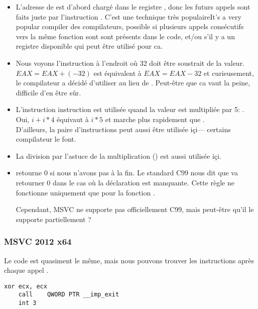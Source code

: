 \begin{itemize}
\item L'adresse de \printf est d'abord chargé dans le
registre \ESI, donc les futurs
appels \printf sont faits juste par l'instruction .
C'est une technique très populaireIt's a very popular compiler 
des compilateurs, possible si plusieurs appels consécutifs vers la même fonction sont sont présents
dans le code, et/ou s'il y a un registre disponible qui peut être utilisé pour ca.

\item Nous voyons l'instruction  
à l'endroit où 32 doit être soustrait de la valeur.
$EAX=EAX+(-32)$ est équivalent à $EAX=EAX-32$ 
et curieusement, le compilateur a décidé d'utiliser  au lieu de .
Peut-être que ca vaut la peine, difficile d'en être sûr.

\item L'instruction \LEA instruction est utilisée quand 
la valeur est multipliée par 5: .
Oui, $i+i*4$ équivaut à $i*5$ et \LEA 
marche plus rapidement que .\\
D'ailleurs, la paire d'instructions  peut aussi être utilisée içi---
certains compilateur le font.

\item La division par l'astuce de la multiplication () 
est aussi utilisée içi.

\item \main retourne 0 si nous n'avons pas  
à la fin.
Le standard C99 nous dit  que \main 
va retourner 0 dans le cas où 
la déclaration  est manquante.
Cette règle ne fonctionne uniquement que pour la fonction \main.

Cependant, MSVC ne supporte pas officiellement C99, mais peut-être qu'il le supporte partiellement ?
\end{itemize}

\subsubsection{\Optimizing MSVC 2012 x64}

Le code est quasiment le même, mais nous pouvons trouver les instructions  après chaque appel .

\begin{lstlisting}[style=customasmx86]
	xor	ecx, ecx
	call	QWORD PTR __imp_exit
	int	3
\end{lstlisting}

